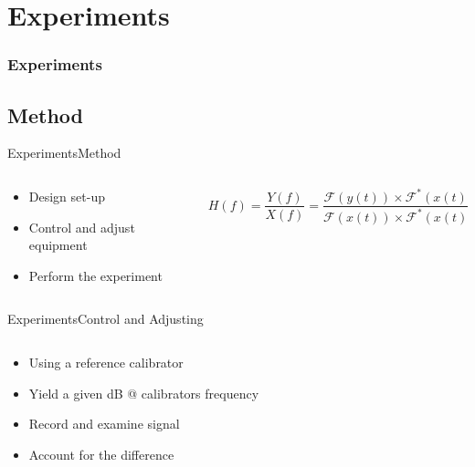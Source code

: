 \section{Experiments}
\begin{frame}
	\frametitle{Experiments}
	\tableofcontents[currentsection]
\end{frame}

\subsection{Method}
\begin{frame}{Experiments}{Method}		
	\begin{columns}
		\begin{column}{0.5\textwidth}
			\begin{itemize}
				\item Design set-up
				\item Control and adjust equipment
				\item Perform the experiment
			\end{itemize}	
		\end{column}
		\begin{column}{0.5\textwidth} 
			\begin{equation*}
			H(f)=\frac{Y(f)}{X(f)}=\frac{\mathscr{F}(y(t))\times\mathscr{F}^{\ast}(x(t))}{\mathscr{F}(x(t))\times\mathscr{F}^{\ast}(x(t))}
		\end{equation*}
		\end{column}
	\end{columns}
\end{frame}

\begin{frame}{Experiments}{Control and Adjusting}		
	\begin{columns}
		\begin{column}{0.8\textwidth}
			\begin{itemize}
				\item Using a reference calibrator
				\item Yield a given dB @ calibrators frequency
				\item Record and examine signal
				\item Account for the difference 
			\end{itemize}	
		\end{column}	
		\begin{column}{0.5\textwidth} 
		\end{column}
	\end{columns}
\end{frame}

